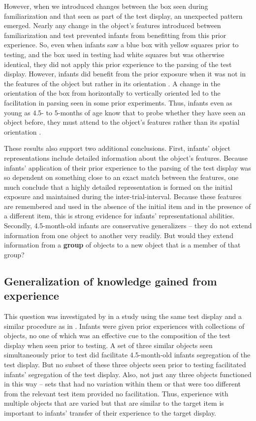However, when we introduced changes between the box seen during
familiarization and that seen as part of the test display, an
unexpected pattern emerged.  Nearly any change in the object's
features introduced between familiarization and test prevented infants
from benefitting from this prior experience.  So, even when infants
saw a blue box with yellow squares prior to testing, and the box used
in testing had white squares but was otherwise identical, they did not
apply this prior experience to the parsing of the test display.
However, infants did benefit from the prior exposure when it was not
in the features of the object but rather in its orientation 
 \cite{needham01object}.  
A change in the orientation of the box from horizontally to
vertically oriented led to the facilitation in parsing seen in some
prior experiments.  Thus, infants even as young as 4.5- to 5-months of
age know that to probe whether they have seen an object before, they
must attend to the object's features rather than its spatial
orientation \cite{needham01object}.

These results also support two additional conclusions.  First,
infants' object representations include detailed information
about the object's features.  Because infants'
application of their prior experience to the parsing of the test
display was so dependent on something close to an exact match between
the features, one much conclude that a highly detailed representation
is formed on the initial exposure and maintained during the
inter-trial-interval.  Because these features are remembered and used
in the absence of the initial item and in the presence of a different
item, this is strong evidence for infants' representational
abilities.  Secondly, 4.5-month-old infants are conservative
generalizers -- they do not extend information from one object to
another very readily.  But would they extend information from a {\bf group}
of objects to a new object that is a member of that group?


\subsection{Generalization of knowledge gained from experience}

This question was investigated by 
in a study using the same test display and a similar procedure as in
.  Infants were given prior experiences with collections
of objects, no one of which was an effective cue to the composition of
the test display when seen prior to testing.  A set of three similar
objects seen simultaneously prior to test did facilitate 4.5-month-old
infants segregation of the test display.  But no subset of these three
objects seen prior to testing facilitated infants' segregation of the
test display.  Also, not just any three objects functioned in this way
-- sets that had no variation within them or that were too different
from the relevant test item provided no facilitation.  Thus,
experience with multiple objects that are varied but that are similar
to the target item is important to infants' transfer of their
experience to the target display.



